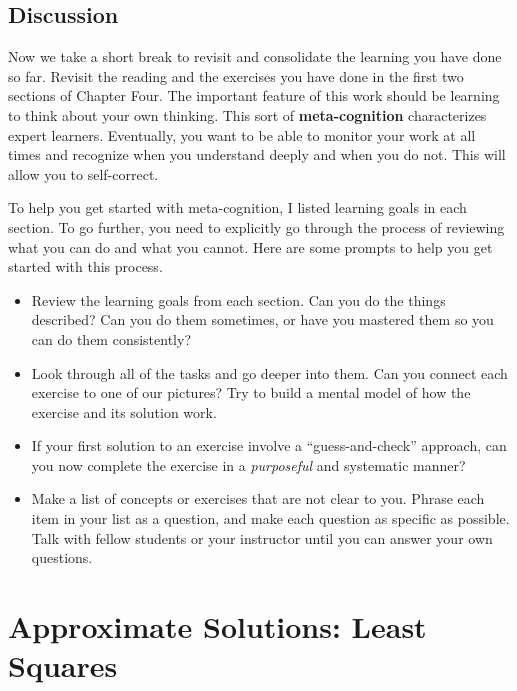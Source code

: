 \documentclass[10pt,]{book}
\newcommand{\terminology}[1]{\textbf{#1}}
\theoremstyle{plain}
\theoremstyle{definition}
\numberwithin{equation}{section}
\begin{document}
\subsection[Discussion]{Discussion}\label{subsection-103}
Now we take a short break to revisit and consolidate the learning you
      have done so far. Revisit the reading and the exercises you have done in
      the first two sections of Chapter Four. The important feature of this work should be
      learning to think about your own thinking. This sort of \terminology{meta-cognition}
      characterizes expert learners. Eventually, you want to be able to monitor
      your work at all times and recognize when you understand deeply and when
      you do not. This will allow you to self-correct.
\par
To help you get started with meta-cognition, I listed learning goals in
      each section. To go further, you need to explicitly go through the process
      of reviewing what you can do and what you cannot. Here are some prompts to
      help you get started with this process.
      \begin{itemize}
\item{}
          Review the learning goals from each section. Can you do the things
          described? Can you do them sometimes, or have you mastered them so you
          can do them consistently?
        \item{}
          Look through all of the tasks and go deeper into them. Can you
          connect each exercise to one of our pictures? Try to build a mental
          model of how the exercise and its solution work.
        \item{}
          If your first solution to an exercise involve a ``guess-and-check''
          approach, can you now complete the exercise in a \emph{purposeful}
          and systematic manner?
        \item{}
          Make a list of concepts or exercises that are not clear to you. Phrase
          each item in your list as a question, and make each question as
          specific as possible. Talk with fellow students or your
          instructor until you can answer your own questions.
        \end{itemize}

\clearpage
\typeout{************************************************}
\typeout{************************************************}
\section[Approximate Solutions: Least Squares]{Approximate Solutions: Least Squares}\label{section-least-squares}
\typeout{************************************************}
\typeout{************************************************}
\end{document}
